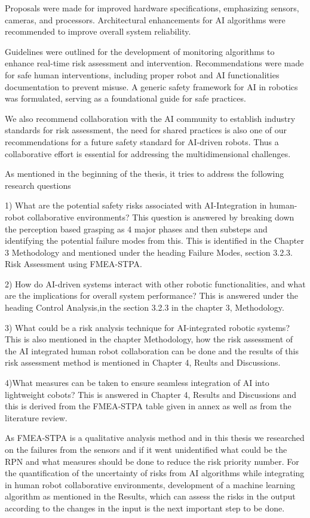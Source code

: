 { Proposals were made for improved hardware specifications, emphasizing sensors, cameras, and processors. Architectural enhancements for AI algorithms were recommended to improve overall system reliability.

 Guidelines were outlined for the development of monitoring algorithms to enhance real-time risk assessment and intervention. Recommendations were made for safe human interventions, including proper robot and AI functionalities documentation to prevent misuse. A generic safety framework for AI in robotics was formulated, serving as a foundational guide for safe practices.

 We also recommend collaboration with the AI community to establish industry standards for risk assessment, the need for shared practices is also one of our recommendations for a future safety standard for AI-driven robots. Thus a collaborative effort is essential for addressing the multidimensional challenges.

 As mentioned in the beginning of the thesis, it tries to address the following research questions 
 
 1) What are the potential  safety risks associated with AI-Integration in human-robot collaborative environments? This question is answered by breaking down the perception based grasping as 4 major phases and then substeps and identifying  the potential failure modes from this. This is identified in the Chapter 3 Methodology and mentioned under the heading Failure Modes, section 3.2.3. Risk Assessment using FMEA-STPA.

 2) How do AI-driven systems interact with other robotic functionalities, and what are the implications for overall system performance? This is answered under the heading Control Analysis,in the section 3.2.3 in the chapter 3, Methodology.
 
 3) What could be a risk analysis technique for AI-integrated robotic systems? This is also mentioned in the chapter Methodology, how the risk assessment of the AI integrated human robot collaboration can be done and the results of this risk assessment method is mentioned in Chapter 4, Reults and Discussions.

4)What measures can be taken to ensure seamless integration of AI into lightweight cobots?
This is answered in Chapter 4, Results and Discussions and this is derived from the FMEA-STPA table given in annex as well as from the literature review.

As FMEA-STPA is a qualitative analysis method and  in this thesis we researched on the failures from the sensors and if it went unidentified what could be the RPN and what measures should be done to reduce the risk priority number.  For the quantification of the uncertainty of risks from AI algorithms while integrating in human robot collaborative environments, development of a machine learning algorithm as mentioned in the Results, which can assess the risks in the output according to the changes in the input is the next important step to be done.

}
